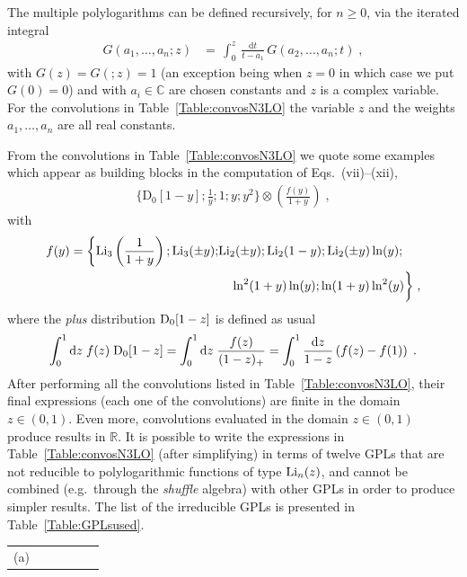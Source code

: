 \documentclass[12pt]{article}
\DeclareRobustCommand{\nn}{\nonumber}
\DeclareRobustCommand{\rd}{\ensuremath{\mathrm{d}}}
\begin{document}
\begin{appendix}
The multiple polylogarithms can be defined recursively, for $n\geq 0$, via the iterated integral~\cite{Goncharov:1998kja,Gehrmann:2000zt,Goncharov:2001iea}
\begin{align}
   G(a_1,\ldots,a_n;z) &= \,\int_0^z\,\frac{\rd t}{t-a_1}\,G(a_2,\ldots,a_n;t) \;,
  \label{MultPolyLogdef}
\end{align}
with $G(z) = G(;z)=1$ (an exception being when $z=0$ in which case we put $G(0)=0$) and with $a_i\in \mathbb{C}$ are chosen constants and $z$ is a complex variable. For the convolutions in Table~\ref{Table:convosN3LO} the variable $z$ and the weights $a_1,\ldots,a_n$ are all real constants.

From the convolutions in Table~\ref{Table:convosN3LO} we quote some  examples which appear as building blocks in the computation of Eqs.~(vii)--(xii),
\begin{align}
  \bigg\{\mathrm{D}_{0}[1-y];\frac{1}{y};1;y;y^{2}\bigg\} \otimes \left( \frac{f(y)}{1+y} \right) \;,
\end{align}
with 
\begin{align}
  f(y) =
  \bigg\{{\rm Li}_{3}\left(\frac{1}{1+y}\right); {\rm Li}_{3}(\pm y); 
  & {\rm Li}_{2}(\pm y); {\rm Li}_{2}(1- y); {\rm Li}_{2}(\pm y) \ln(y);
  \nn\\&\quad
  \ln^{2}(1+y)\ln(y);\ln(1+y)\ln^{2}(y)\bigg\} \;,
\end{align}
where the \textit{plus} distribution ${\rm D}_{0}[1-z]$ is defined as usual 
\begin{align}
  \int^{1}_{0}\rd z \; f(z) \; {\rm D}_{0}[1-z] =\int^{1}_{0}\rd z \; \frac{f(z)}{(1-z)_{+}} = \int^{1}_{0}\frac{\rd z}{1-z}\left( f(z)-f(1)\right) \;.
\end{align}
After performing all the convolutions listed in Table~\ref{Table:convosN3LO}, their final expressions (each one of the convolutions) are finite in the domain $z\in (0,1)$. Even more, convolutions evaluated in the domain $z\in (0,1)$ produce results in $\mathbb{R}$. It is possible to write the expressions in Table~\ref{Table:convosN3LO} (after simplifying) in terms of twelve GPLs that are not reducible to polylogarithmic functions of type ${\rm Li}_n(z)$, 
 and cannot be combined (e.g.\ through the \textit{shuffle} algebra) with other GPLs in order to produce simpler results. 
The list of the irreducible GPLs is presented in Table~\ref{Table:GPLsused}.
\begin{table}
\begin{center}
\renewcommand{\arraystretch}{1.5}
\begin{tabular}{ |c|c||c|c||c|c| }
\hline
\multirow{1}{*}{(a)} 


\end{tabular}
\end{center}
\end{table}
\end{appendix}
\end{document}
